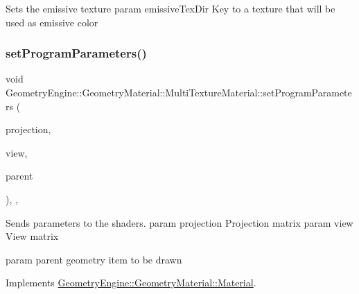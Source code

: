 Sets the emissive texture param emissive\+Tex\+Dir Key to a texture that will be used as emissive color \mbox{\label{class_geometry_engine_1_1_geometry_material_1_1_multi_texture_material_a5f07e3b2b0867d3905f912159ef2f67b}} 
\subsubsection{\texorpdfstring{setProgramParameters()}{setProgramParameters()}}
{\footnotesize\ttfamily void Geometry\+Engine\+::\+Geometry\+Material\+::\+Multi\+Texture\+Material\+::set\+Program\+Parameters (\begin{DoxyParamCaption}\item[{const Q\+Matrix4x4 \&}]{projection,  }\item[{const Q\+Matrix4x4 \&}]{view,  }\item[{const \mbox{\hyperlink{class_geometry_engine_1_1_geometry_world_item_1_1_geometry_item_1_1_geometry_item}{Geometry\+World\+Item\+::\+Geometry\+Item\+::\+Geometry\+Item}} \&}]{parent }\end{DoxyParamCaption})\hspace{0.3cm}{\ttfamily [override]}, {\ttfamily [protected]}, {\ttfamily [virtual]}}

Sends parameters to the shaders. param projection Projection matrix param view View matrix

param parent geometry item to be drawn 

Implements \mbox{\hyperlink{class_geometry_engine_1_1_geometry_material_1_1_material_a68310797df53062f237d0005fbcfce7e}{Geometry\+Engine\+::\+Geometry\+Material\+::\+Material}}.

\mbox{\label{class_geometry_engine_1_1_geometry_material_1_1_multi_texture_material_a0b4cf7c8265e633210bc39b5e7d31f1d}} 
